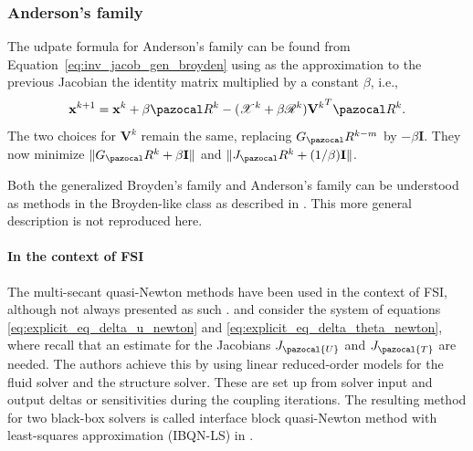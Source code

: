 \subsubsection{Anderson's family}

The udpate formula for Anderson's family can be found from Equation~\eqref{eq:inv_jacob_gen_broyden} using as the approximation to the previous Jacobian the identity matrix multiplied by a constant \(\beta\), i.e.,
\begin{equation} \label{eq:andersons_family_update}
  \mathbf x^{k+1} = \mathbf x^{k} + \beta \pazocal R^k - (\mathscr X^k + \beta\mathscr R^k){\mathbf V^k}^T \pazocal R^k.
\end{equation}
The two choices for \(\mathbf V^k\) remain the same, replacing \(G_\pazocal R^{k-m}\) by \(-\beta\mathbf I\).
They now minimize \(\|G_\pazocal R^k+\beta\mathbf I\|\) and \(\|J_\pazocal R^k + (1/\beta)\mathbf I\|\).

Both the generalized Broyden's family and Anderson's family can be understood as methods in the Broyden-like class as described in \cite{fang_two_2009}.
This more general description is not reproduced here.
%

\paragraph{In the context of FSI}

The multi-secant quasi-Newton methods have been used in the context of FSI, although not always presented as such \citep{haelterman_quasi-newton_2009, gatzhammer_efficient_2014, uekermann_partitioned_2016, scheufele_coupling_2018}.
 \cite{vierendeels_implicit_2007} and \cite{degroote_stability_2008} consider the system of equations \eqref{eq:explicit_eq_delta_u_newton} and \eqref{eq:explicit_eq_delta_theta_newton}, where recall that an estimate for the Jacobians \(J_\pazocal{U}\) and \(J_\pazocal{T}\) are needed.
The authors achieve this by using linear reduced-order models for the fluid solver and the structure solver.
These are set up from solver input and output deltas or sensitivities during the coupling iterations.
The resulting method for two black-box solvers is called interface block quasi-Newton method with least-squares approximation (IBQN-LS) in \cite{degroote_development_2010}.

